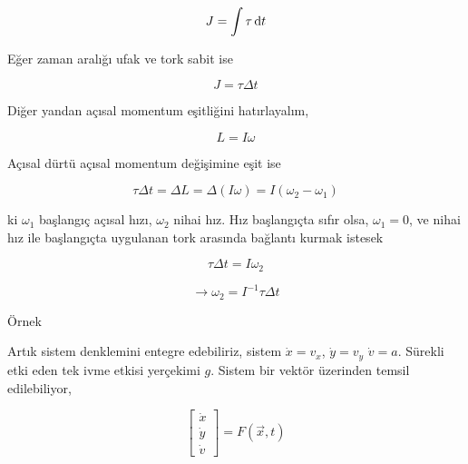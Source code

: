 \documentclass[12pt,fleqn]{article}\usepackage{../../common}
\begin{document}
$$
J = \int \tau \,\mathrm{d} t
$$

Eğer zaman aralığı ufak ve tork sabit ise

$$
J = \tau \Delta t
$$

Diğer yandan açısal momentum eşitliğini hatırlayalım,

$$
L = I \omega
$$

Açısal dürtü açısal momentum değişimine eşit ise

$$
\tau \Delta t = \Delta L = \Delta (I \omega)= I (\omega_2 - \omega_1)
$$

ki $\omega_1$ başlangıç açısal hızı, $\omega_2$ nihai hız. Hız başlangıçta sıfır
olsa, $\omega_1 = 0$, ve nihai hız ile başlangıçta uygulanan tork arasında
bağlantı kurmak istesek

$$
\tau \Delta t = I \omega_2 
$$

$$
\to \omega_2 = I^{-1} \tau \Delta t
$$

Örnek

Artık sistem denklemini entegre edebiliriz, sistem $\dot{x} = v_x$,
$\dot{y} = v_y$ $\dot{v} = a$. Sürekli etki eden tek ivme etkisi yerçekimi
$g$. Sistem bir vektör üzerinden temsil edilebiliyor,

$$
\left[\begin{array}{c}
\dot{x} \\ \dot{y} \\ \dot{v}
\end{array}\right] = F(\vec{x},t)
$$
\end{document}
